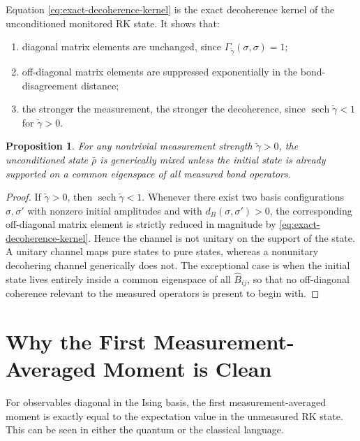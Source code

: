 \documentclass[11pt]{article}
\newcommand{\sech}{\operatorname{sech}}
\newtheorem{proposition}{Proposition}
\begin{document}
Equation \eqref{eq:exact-decoherence-kernel} is the exact decoherence kernel of the unconditioned monitored RK state. It shows that:
\begin{enumerate}[label=\arabic*.]
  \item diagonal matrix elements are unchanged, since $\Gamma_{\tilde\gamma}(\sigma,\sigma)=1$;
  \item off-diagonal matrix elements are suppressed exponentially in the bond-disagreement distance;
  \item the stronger the measurement, the stronger the decoherence, since $\sech\tilde\gamma<1$ for $\tilde\gamma>0$.
\end{enumerate}

\begin{proposition}
For any nontrivial measurement strength $\tilde\gamma>0$, the unconditioned state $\bar\rho$ is generically mixed unless the initial state is already supported on a common eigenspace of all measured bond operators.
\end{proposition}

\begin{proof}
If $\tilde\gamma>0$, then $\sech\tilde\gamma<1$. Whenever there exist two basis configurations $\sigma,\sigma'$ with nonzero initial amplitudes and with $d_B(\sigma,\sigma')>0$, the corresponding off-diagonal matrix element is strictly reduced in magnitude by \eqref{eq:exact-decoherence-kernel}. Hence the channel is not unitary on the support of the state. A unitary channel maps pure states to pure states, whereas a nonunitary decohering channel generically does not. The exceptional case is when the initial state lives entirely inside a common eigenspace of all $\hat B_{ij}$, so that no off-diagonal coherence relevant to the measured operators is present to begin with.
\end{proof}

\section{Why the First Measurement-Averaged Moment is Clean}

For observables diagonal in the Ising basis, the first measurement-averaged moment is exactly equal to the expectation value in the unmeasured RK state. This can be seen in either the quantum or the classical language.
\end{document}
